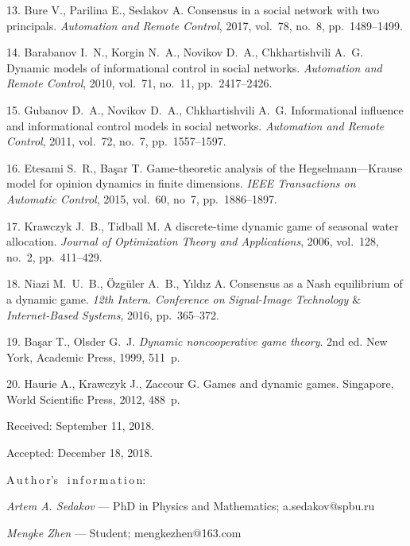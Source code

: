 {13. Bure V., Parilina E., Sedakov A. Consensus in a social network
with two principals. \emph{Automation and Remote Control}, 2017,
vol.~78, no.~8, pp.~1489--1499.

14. Barabanov I.~N., Korgin N.~A., Novikov D.~A., Chkhartishvili
A.~G. Dynamic models of informational control in social networks.
\emph{Automation and Remote Control}, 2010, vol.~71, no.~11,
pp.~2417--2426.

15. Gubanov D.~A., Novikov D.~A., Chkhartishvili A.~G.
Informational influence and informational control models in social
networks. \emph{Automation and Remote Control}, 2011, vol.~{72},
no.~7, pp.~{1557--1597}.

16. Etesami S.~R., Ba{\c{s}}ar T. Game-theoretic analysis of the
Hegselmann---Krause model for opinion dynamics in finite
dimensions. \emph{IEEE Transactions on Automatic Control}, 2015,
vol.~{60}, no~{7}, pp.~{1886--1897}.

17. Krawczyk J.~B., Tidball M. A discrete-time dynamic game of
seasonal water allocation. \emph{Journal of Optimization Theory
and Applications}, 2006, vol.~128, no.~2, pp.~411--429.

18. Niazi M.~U.~B., \"{O}zg\"{u}ler A.~B., Y{\i}ld{\i}z A.
Consensus as a Nash equilibrium of a dynamic game. \emph{12th
Intern. Conference on Signal-Image Technology $\&$ Internet-Based
Systems}, 2016, pp.~{365--372}.

19. Ba{\c{s}}ar T., Olsder G.~J. \emph{Dynamic noncooperative game
theory}. 2nd ed. New York, Academic Press, 1999, 511~p.

20. Haurie A., Krawczyk J., Zaccour G. Games and dynamic games.
Singapore, World Scientific Press, 2012, 488~p.


\vskip 1.5mm

%


Received:  September 11, 2018.

Accepted: December 18, 2018.


\vskip6mm A\,u\,t\,h\,o\,r's \ i\,n\,f\,o\,r\,m\,a\,t\,i\,o\,n:

\vskip2mm\textit{Artem A. Sedakov} --- PhD in Physics and
Mathematics; a.sedakov@spbu.ru

\vskip2mm\textit{Mengke Zhen} --- Student; mengkezhen@163.com

}
